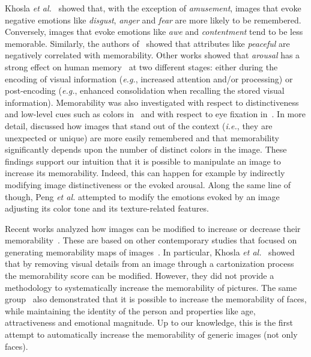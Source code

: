 \documentclass{sig-alternate-05-2015}
\begin{document}
Khosla \textit{et al.}~\cite{khosla2015understanding} showed that, with the exception of \emph{amusement}, images that evoke negative emotions like \emph{disgust}, \emph{anger} and \emph{fear} are more likely to be remembered. Conversely, images that evoke emotions like \emph{awe} and \emph{contentment} tend to be less memorable. Similarly, the authors of~\cite{isola2011understanding} showed that attributes like \emph{peaceful} are negatively correlated with memorability. Other works showed that \emph{arousal} has a strong effect on human memory~\cite{anderson2006emotion,cahill1995novel,bradley1992remembering,mcgaugh2006make} at two different stages: either during the encoding of visual information (\textit{e.g.}, increased attention and/or processing) or post-encoding (\textit{e.g.}, enhanced consolidation when recalling the stored visual information). Memorability was also investigated with respect to distinctiveness and low-level cues such as colors in~\cite{borkin2013makes} and with respect to eye fixation in~\cite{khosla2015understanding,bylinskii2015intrinsic}. In more detail, \cite{borkin2013makes} discussed how images that stand out of the context (\textit{i.e.}, they are unexpected or unique) are more easily remembered and that memorability significantly depends upon the number of distinct colors in the image. %
These findings support our intuition that it is possible to {manipulate an image to increase its memorability}.
Indeed, this can happen for example by indirectly modifying image distinctiveness or the evoked arousal. Along the same line of though, Peng \textit{et al.} \cite{peng2015mixed} attempted to modify the emotions evoked by an image adjusting its color tone and its texture-related features.

Recent works analyzed how images can be modified to increase or decrease their memorability~\cite{khosla2013modifying,khosla2015understanding}. These are based on other contemporary studies that focused on generating memorability maps of images~\cite{khosla2012image,khosla2012memorability,khosla2014what}. In particular, Khosla \textit{et al.}~\cite{khosla2015understanding} showed that by removing visual details from an image through a cartonization process the memorability score can be modified. However, they did not provide a methodology to systematically increase the memorability of pictures. The same group~\cite{khosla2013modifying} also demonstrated that it is possible to increase the memorability of faces, while maintaining the identity of the person and properties like age, attractiveness and emotional magnitude. Up to our knowledge, this is the first attempt to automatically increase the memorability of generic images (not only faces).
\end{document}
